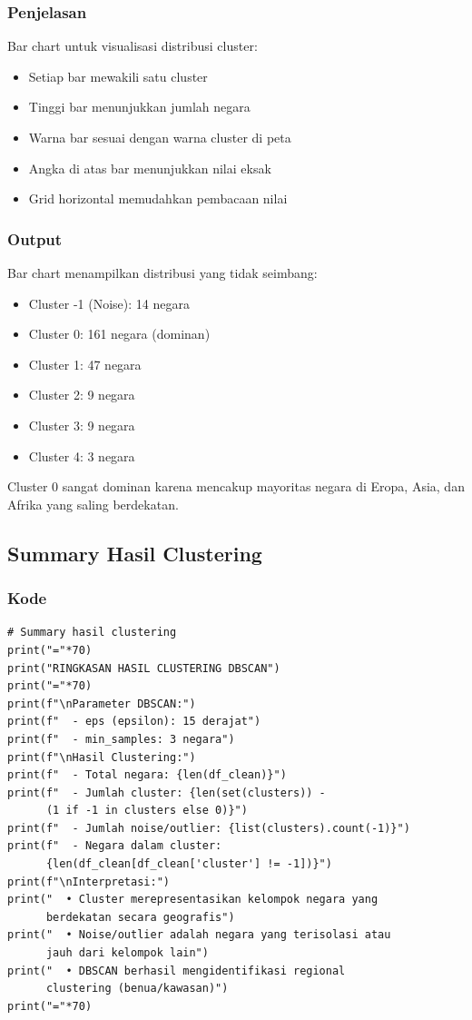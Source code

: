 \documentclass[12pt,a4paper]{article}
\begin{document}
\subsubsection{Penjelasan}
Bar chart untuk visualisasi distribusi cluster:
\begin{itemize}
    \item Setiap bar mewakili satu cluster
    \item Tinggi bar menunjukkan jumlah negara
    \item Warna bar sesuai dengan warna cluster di peta
    \item Angka di atas bar menunjukkan nilai eksak
    \item Grid horizontal memudahkan pembacaan nilai
\end{itemize}

\subsubsection{Output}
Bar chart menampilkan distribusi yang tidak seimbang:
\begin{itemize}
    \item Cluster -1 (Noise): 14 negara
    \item Cluster 0: 161 negara (dominan)
    \item Cluster 1: 47 negara
    \item Cluster 2: 9 negara
    \item Cluster 3: 9 negara
    \item Cluster 4: 3 negara
\end{itemize}

Cluster 0 sangat dominan karena mencakup mayoritas negara di Eropa, Asia, dan Afrika yang saling berdekatan.

\subsection{Summary Hasil Clustering}

\subsubsection{Kode}
\begin{lstlisting}[style=pythonstyle]
# Summary hasil clustering
print("="*70)
print("RINGKASAN HASIL CLUSTERING DBSCAN")
print("="*70)
print(f"\nParameter DBSCAN:")
print(f"  - eps (epsilon): 15 derajat")
print(f"  - min_samples: 3 negara")
print(f"\nHasil Clustering:")
print(f"  - Total negara: {len(df_clean)}")
print(f"  - Jumlah cluster: {len(set(clusters)) - 
      (1 if -1 in clusters else 0)}")
print(f"  - Jumlah noise/outlier: {list(clusters).count(-1)}")
print(f"  - Negara dalam cluster: 
      {len(df_clean[df_clean['cluster'] != -1])}")
print(f"\nInterpretasi:")
print("  • Cluster merepresentasikan kelompok negara yang 
      berdekatan secara geografis")
print("  • Noise/outlier adalah negara yang terisolasi atau 
      jauh dari kelompok lain")
print("  • DBSCAN berhasil mengidentifikasi regional 
      clustering (benua/kawasan)")
print("="*70)
\end{lstlisting}
\end{document}
